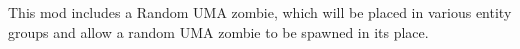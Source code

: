 This mod includes a Random U\+MA zombie, which will be placed in various entity groups and allow a random U\+MA zombie to be spawned in its place. 